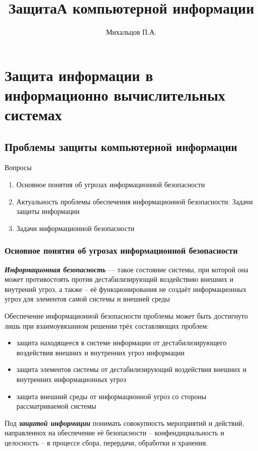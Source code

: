 \documentclass[a4paper,14pt]{extarticle}
\title{\textbf{ЗащитаА компьютерной информации}}
\author{Михальцов П.А.}
\begin{document}
	\maketitle
	\section{Защита информации в информационно вычислительных системах}
	\subsection{Проблемы защиты компьютерной информации}
	Вопросы 
	\begin{enumerate}
		\item Основное понятия об угрозах информационной безопасности
		\item Актуальность проблемы обеспечения информационной безопасности. Задачи защиты информации
		\item Задачи информационной безопасности
	\end{enumerate}
	\subsubsection{Основное понятия об угрозах информационной безопасности}
	\textbf{\textit{Информационная безопасность}} --- такое состояние системы, при которой она может противостоять против дестабилизирующий воздействию внешних и внутрений угроз, а также -- её функционирования не создаёт информационных угроз для элементов самой системы и внешней среды
	
	Обеспечение информационной безопасности проблемы может быть достигнуто лишь при взаимоувязанном решении трёх составляющих проблем:
	\begin{itemize}
		\item защита находящееся в системе информации от дестабилизирующего воздействия внешних и внутренних угроз информации
		\item защита элементов системы от дестабилизирующий воздействия внешних и внутренних информационных угроз 
		\item защита внешний среды от информационной угроз со стороны рассматриваемой системы 
	\end{itemize}

	\vspace{\baselineskip}
	Под \textbf{\textit{защитой информации}} понимать совокупность мероприятий и действий, направленнох на обеспечение её безопасности -- конфендициальность и целосность -- в процессе сбора, перердачи, обработки и хранения.
	
\end{document}
